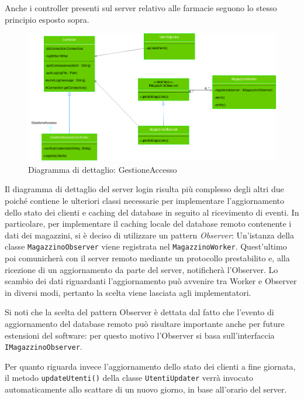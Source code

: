 Anche i controller presenti sul server relativo alle farmacie seguono lo stesso principio esposto sopra.

\newpage

\begin{figure}[h!]
    \begin{center}
        \includegraphics[width=\textwidth]{immagini/ControllerLogin-progettazione.png}
        \caption{Diagramma di dettaglio: GestioneAccesso}
    \end{center}
\end{figure}

Il diagramma di dettaglio del server login risulta più complesso degli altri due
poiché contiene le ulteriori classi necessarie per implementare l'aggiornamento dello stato dei clienti
e caching del database in seguito al ricevimento di eventi.
In particolare, per implementare il caching locale del database remoto contenente i dati dei magazzini,
si è deciso di utilizzare un pattern \textit{Observer}: Un'istanza della classe \texttt{MagazzinoObserver} viene registrata
nel \texttt{MagazzinoWorker}. Quest'ultimo poi comunicherà con il server remoto mediante un protocollo prestabilito e,
alla ricezione di un aggiornamento da parte del server, notificherà l'Observer. Lo scambio dei dati riguardanti l'aggiornamento può avvenire tra Worker e Observer in diversi modi,
pertanto la scelta viene lasciata agli implementatori.

Si noti che la scelta del pattern Observer è dettata dal fatto che l'evento di aggiornamento del database remoto può risultare importante anche per future estensioni del software:
per questo motivo l'Observer si basa sull'interfaccia \texttt{IMagazzinoObserver}.

Per quanto riguarda invece l'aggiornamento dello stato dei clienti a fine giornata,
il metodo \texttt{updateUtenti()} della classe \texttt{UtentiUpdater} verrà invocato automaticamente
allo scattare di un nuovo giorno, in base all'orario del server.


